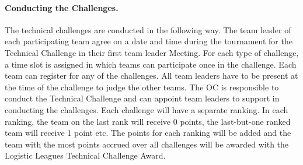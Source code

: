 \documentclass[12pt,twoside]{article}
\begin{document}
\paragraph{Conducting the Challenges.~}
The technical challenges are conducted in the following way. The team
leader of each participating team agree on a date and time during the
tournament for the Technical Challenge in their first team leader
Meeting. For each type of challenge, a time slot is assigned in which
teams can participate once in the challenge. Each team can register
for any of the challenges. All team leaders have to be present at the
time of the challenge to judge the other teams. The OC is responsible
to conduct the Technical Challenge and can appoint team leaders to
support in conducting the challenges. Each challenge will have a
separate ranking. In each ranking, the team on the last rank will
receive 0 points, the last-but-one ranked team will receive 1 point
etc. The points for each ranking will be added and the team with the
most points accrued over all challenges will be awarded with the
Logistic Leagues Technical Challenge Award.











\end{document}
